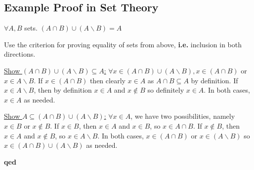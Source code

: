 \documentclass[10pt]{article}
\begin{document}
	\subsection{Example Proof in Set Theory}
	\begin{description}
		\item[Proposition:] $\forall A, B$ sets. $(A \cap B) \cup (A \backslash B) = A$
		\item[Proof:] Use the criterion for proving equality of sets from above, \textbf{i.e.} inclusion in both directions.
		\item \underline{Show $(A \cap B) \cup (A \backslash B) \subseteq A$:} $\forall x \in (A \cap B) \cup (A \backslash B), x \in (A \cap B)$ or $x \in A \backslash B$. If $x \in (A \cap B)$ then clearly $x \in A$ as $A \cap B \subseteq A$ by definition. If $x \in A \backslash B$, then by definition $x \in A$ and $x \notin B$ so definitely $x \in A$. In both cases, $x \in A$ as needed.
		\item \underline{Show $A \subseteq (A \cap B) \cup (A \backslash B)$:} $\forall x \in A$, we have two possibilities, namely $x \in B$ or $x \notin B$. If $x \in B$, then $x \in A$ and $x \in B$, so $x \in A \cap B$. If $x \notin B$, then $x \in A$ and $x \notin B$, so $x \in A \backslash B$. In both cases, $x \in (A \cap B)$ or $x \in (A \backslash B)$ so $x \in (A \cap B) \cup (A \backslash B)$ as needed.
		\item \textbf{qed}
	\end{description}
	
\end{document}
